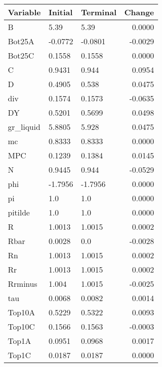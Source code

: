 \begin{table}
\centering
\label{tab:stst_comparison_end_L_wedge_permanent_asymmetric}
\begin{tabular}{lllr}
\toprule
                Variable & Initial & Terminal &  Change \\
\midrule
                       B &    5.39 &     5.39 &  0.0000 \\
                  Bot25A & -0.0772 &  -0.0801 & -0.0029 \\
                  Bot25C &  0.1558 &   0.1558 &  0.0000 \\
                       C &  0.9431 &    0.944 &  0.0954 \\
                       D &  0.4905 &    0.538 &  0.0475 \\
                     div &  0.1574 &   0.1573 & -0.0635 \\
                      DY &  0.5201 &   0.5699 &  0.0498 \\
               gr\_liquid &  5.8805 &    5.928 &  0.0475 \\
                      mc &  0.8333 &   0.8333 &  0.0000 \\
                     MPC &  0.1239 &   0.1384 &  0.0145 \\
                       N &  0.9445 &    0.944 & -0.0529 \\
                     phi & -1.7956 &  -1.7956 &  0.0000 \\
                      pi &     1.0 &      1.0 &  0.0000 \\
                 pitilde &     1.0 &      1.0 &  0.0000 \\
                       R &  1.0013 &   1.0015 &  0.0002 \\
                    Rbar &  0.0028 &      0.0 & -0.0028 \\
                      Rn &  1.0013 &   1.0015 &  0.0002 \\
                      Rr &  1.0013 &   1.0015 &  0.0002 \\
                 Rrminus &   1.004 &   1.0015 & -0.0025 \\
                     tau &  0.0068 &   0.0082 &  0.0014 \\
                  Top10A &  0.5229 &   0.5322 &  0.0093 \\
                  Top10C &  0.1566 &   0.1563 & -0.0003 \\
                   Top1A &  0.0951 &   0.0968 &  0.0017 \\
                   Top1C &  0.0187 &   0.0187 &  0.0000 \\

\end{tabular}
\end{table}
